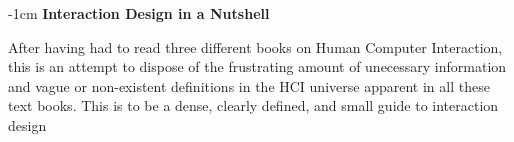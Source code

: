 \newpage \thispagestyle{empty} \pagecolor{YellowOrange}
\vspace*{3cm}
\begin{adjustwidth*}{}{-1cm}
  \noindent \textbf{Interaction Design in a Nutshell}

  \vspace*{4pt}
  
  \noindent After having had to read three different books on Human Computer Interaction, this is an attempt to dispose of the frustrating amount of unecessary information and vague or non-existent definitions in the HCI universe apparent in all these text books. This is to be a dense, clearly defined, and small guide to interaction design
\end{adjustwidth*}

